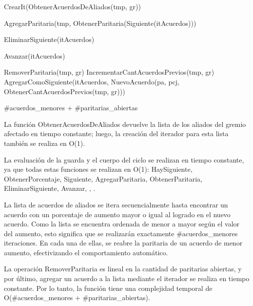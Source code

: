 {

	\state {} \asig CrearIt(ObtenerAcuerdosDeAliados(tmp, gr))		
			
		\state

		\state AgregarParitaria(tmp, ObtenerParitaria(Siguiente(itAcuerdos)))		

		\state EliminarSiguiente(itAcuerdos)										

		\state
		\state Avanzar(itAcuerdos)													
	\endwhile
	\state

	\state {} \asig RemoverParitaria(tmp, gr)											
	\state IncrementarCantAcuerdosPrevios(tmp, gr)														
	\state AgregarComoSiguiente(itAcuerdos, NuevoAcuerdo(pa, pcj, ObtenerCantAcuerdosPrevios(tmp, gr)))	
}
{\#acuerdos\_menores + \#paritarias\_abiertas}
{La funci\'on ObtenerAcuerdosDeAliados devuelve la lista de los aliados del gremio afectado en tiempo constante; luego, la creaci\'on del iterador para esta lista tambi\'en se realiza en O(1). 

\hspace{10pt} La evaluaci\'on de la guarda y el cuerpo del ciclo se realizan en tiempo constante, ya que todas estas funciones se realizan en O(1): HaySiguiente, ObtenerPorcentaje, Siguiente, AgregarParitaria, ObtenerParitaria, EliminarSiguiente, Avanzar, \lyl, \menor.

\hspace{10pt} La lista de acuerdos de aliados se itera secuencialmente hasta encontrar un acuerdo con un porcentaje de aumento mayor o igual al logrado en el nuevo acuerdo. Como la lista se encuentra ordenada de menor a mayor seg\'un el valor del aumento, esto significa que se realizar\'an exactamente \#acuerdos\_menores iteraciones. En cada una de ellas, se reabre la paritaria de un acuerdo de menor aumento, efectivizando el comportamiento autom\'atico.

\hspace{10pt} La operaci\'on RemoverParitaria es lineal en la cantidad de paritarias abiertas, y por \'ultimo, agregar un acuerdo a la lista mediante el iterador se realiza en tiempo constante. Por lo tanto, la funci\'on tiene una complejidad temporal de O(\#acuerdos\_menores + \#paritarias\_abiertas).  }

